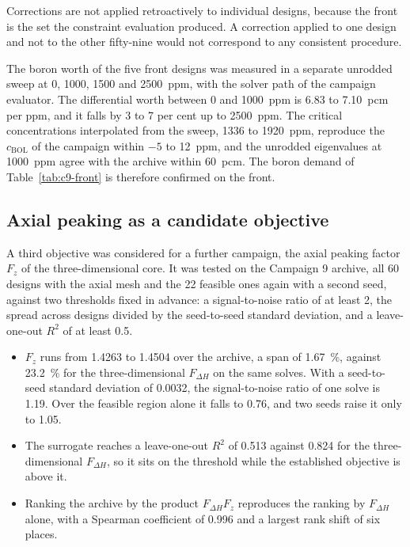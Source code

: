 Corrections are not applied retroactively to individual designs, because
the front is the set the constraint evaluation produced. A correction
applied to one design and not to the other fifty-nine would not correspond
to any consistent procedure.

The boron worth of the five front designs was measured in a separate
unrodded sweep at 0, 1000, 1500 and \SI{2500}{ppm}, with the solver path
of the campaign evaluator. The differential worth between 0 and
\SI{1000}{ppm} is 6.83 to \SI{7.10}{pcm} per ppm, and it falls by 3 to 7
per cent up to \SI{2500}{ppm}. The critical concentrations interpolated
from the sweep, 1336 to \SI{1920}{ppm}, reproduce the $c_\mathrm{BOL}$ of
the campaign within $-5$ to \SI{+12}{ppm}, and the unrodded eigenvalues
at \SI{1000}{ppm} agree with the archive within \SI{60}{pcm}. The boron
demand of Table~\ref{tab:c9-front} is therefore confirmed on the front.

\subsection{Axial peaking as a candidate objective}
\label{sec:res-c10-gate}

A third objective was considered for a further campaign, the axial
peaking factor $F_z$ of the three-dimensional core. It was tested on
the Campaign 9 archive, all 60 designs with the axial mesh and the 22
feasible ones again with a second seed, against two thresholds fixed in
advance: a signal-to-noise ratio of at least 2, the spread across
designs divided by the seed-to-seed standard deviation, and a
leave-one-out $R^2$ of at least 0.5.

\begin{itemize}
  \item $F_z$ runs from 1.4263 to 1.4504 over the archive, a span of
        \SI{1.67}{\%}, against \SI{23.2}{\%} for the three-dimensional
        $F_{\Delta H}$ on the same solves. With a seed-to-seed standard
        deviation of 0.0032, the signal-to-noise ratio of one solve is
        1.19. Over the feasible region alone it falls to 0.76, and two
        seeds raise it only to 1.05.

  \item The surrogate reaches a leave-one-out $R^2$ of 0.513 against
        0.824 for the three-dimensional $F_{\Delta H}$, so it sits on
        the threshold while the established objective is above it.

  \item Ranking the archive by the product $F_{\Delta H} F_z$ reproduces
        the ranking by $F_{\Delta H}$ alone, with a Spearman coefficient
        of 0.996 and a largest rank shift of six places.
\end{itemize}

